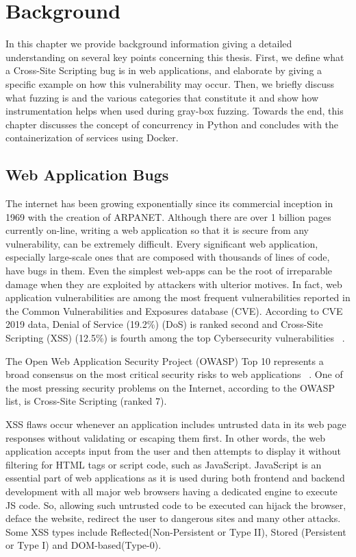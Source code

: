 \chapter{Background}
\label{sec:background}
\minitoc
\vspace*{1cm}

In this chapter we provide background information giving a detailed understanding on several key points concerning this thesis. First, we define what a Cross-Site Scripting bug is in web applications, and elaborate by giving a specific example on how this vulnerability may occur. Then, we briefly discuss what fuzzing is and the various categories that constitute it and show how instrumentation helps when used during gray-box fuzzing. Towards the end, this chapter discusses the concept of concurrency in Python and concludes with the containerization of services using Docker.

\section{Web Application Bugs}
The internet has been growing exponentially since its commercial inception in 1969 with the creation of ARPANET. Although there are over 1 billion pages currently on-line, writing a web application so that it is secure from any vulnerability, can be extremely difficult. Every significant web application, especially large-scale ones that are composed with thousands of lines of code, have bugs in them. Even the simplest web-apps can be the root of irreparable damage when they are exploited by attackers with ulterior motives. In fact, web application vulnerabilities are among the most frequent vulnerabilities reported in the Common Vulnerabilities and Exposures database (CVE). According to CVE 2019 data, Denial of Service (19.2\%) (DoS) is ranked second and Cross-Site Scripting (XSS) (12.5\%) is fourth among the top Cybersecurity vulnerabilities ~\cite{cve}.

The Open Web Application Security Project (OWASP) Top 10 represents a broad consensus on the most critical security risks to web applications ~\cite{owasp2017}. One of the most pressing security problems on the Internet, according to the OWASP list, is Cross-Site Scripting (ranked 7).

XSS flaws occur whenever an application includes untrusted data in its web page responses without validating or escaping them first. In other words, the web application accepts input from the user and then attempts to display it without filtering for HTML tags or script code, such as JavaScript. JavaScript is an essential part of web applications as it is used during both frontend and backend development with all major web browsers having a dedicated engine to execute JS code. So, allowing such untrusted code to be executed can hijack the browser, deface the website, redirect the user to dangerous sites and many other attacks. Some XSS types include Reflected(Non-Persistent or Type II), Stored (Persistent or Type I) and DOM-based(Type-0).

